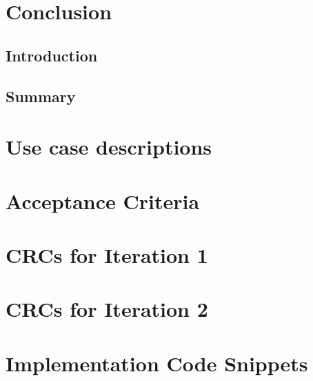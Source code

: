 \documentclass[11pt,oneside]{report}
\newcommand\code[1]{\texttt{#1}}
\begin{document}
	\chapter{Conclusion}\label{chap:concl}
	\section{Introduction}
	\section{Summary}
	\clearpage
	
	
	\begin{appendices}
	\chapter{Use case descriptions} \label{app:use_case_descriptions}
			
			
			
			
			
			
			
	\chapter{Acceptance Criteria} \label{app:acc_crit}
			
	\chapter{CRCs for Iteration 1} \label{app:crc_it_1}
			
			
			
			
			
	\chapter{CRCs for Iteration 2} \label{app:crc_it_2}
			
	\chapter{Implementation Code Snippets}
			
			
			
	\end{appendices}
	
\end{document}

